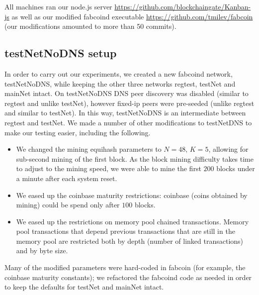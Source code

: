\documentclass{article}
\begin{document}
All machines ran our node.js server \url{https://github.com/blockchaingate/Kanban-js} as well as our modified fabcoind executable \url{https://github.com/tmilev/fabcoin} (our modifications amounted to more than 50 commits). 
\subsection{testNetNoDNS setup}
In order to carry out our experiments, we created a new fabcoind network, testNetNoDNS, while keeping the other three networks regtest, testNet and mainNet intact. On testNetNoDNS DNS peer discovery was disabled (similar to regtest and unlike testNet), however fixed-ip peers were pre-seeded (unlike regtest and similar to testNet). In this way, testNetNoDNS is an intermediate between regtest and testNet. We made a number of other modifications to testNetDNS to make our testing easier, including the following. 

\begin{itemize}
\item We changed the mining equihash parameters to $N=48$, $K=5$, allowing for sub-second mining of the first block. As the block mining difficulty takes time to adjust to the mining speed, we were able to mine the first $200$ blocks under a minute after each system reset.
\item We eased up the coinbase maturity restrictions: coinbase (coins obtained by mining) could be spend only after $100$ blocks.
\item We eased up the restrictions on memory pool chained transactions. Memory pool transactions that depend previous transactions that are still in the memory pool are restricted both by depth (number of linked transactions) and by byte size.
\end{itemize}

Many of the modified parameters were hard-coded in fabcoin (for example, the coinbase maturity constants); we refactored the fabcoind code as needed in order to keep the defaults for testNet and mainNet intact.
\end{document}
